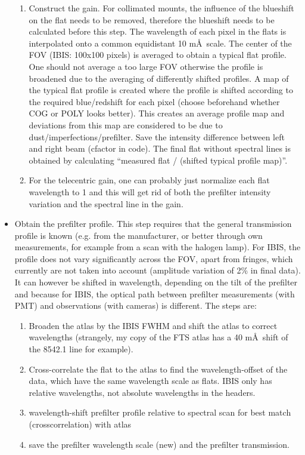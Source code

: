 \documentclass[a4paper,11pt]{article}
\begin{document}
\begin{itemize}
\begin{enumerate}
\item Construct the gain. For collimated mounts, the influence of the blueshift on the flat needs to be removed, therefore the blueshift needs to be calculated before this step. The wavelength of each pixel in the flats is interpolated onto a common equidistant 10 m\AA\ scale. The center of the FOV (IBIS: 100x100 pixels) is averaged to obtain a typical flat profile. One should not average a too large FOV otherwise the profile is broadened due to the averaging of differently shifted profiles. A map of the typical flat profile is created where the profile is shifted according to the required blue/redshift for each pixel (choose beforehand whether COG or POLY looks better). This creates an average profile map and deviations from this map are considered to be due to dust/imperfections/prefilter. Save the intensity difference between left and right beam (cfactor in code). The final flat without spectral lines is obtained by calculating ``measured flat / (shifted typical profile map)''.
\item For the telecentric gain, one can probably just normalize each flat wavelength to 1 and this will get rid of both the prefilter intensity variation and the spectral line in the gain.
\end{enumerate}

\item Obtain the prefilter profile. This step requires that the general transmission profile is known (e.g. from the manufacturer, or better through own measurements, for example from a scan with the halogen lamp). For IBIS, the profile does not vary significantly across the FOV, apart from fringes, which currently are not taken into account (amplitude variation of 2\% in final data). It can however be shifted in wavelength, depending on the tilt of the prefilter and because for IBIS, the optical path between prefilter measurements (with PMT) and observations (with cameras) is different. The steps are:
\begin{enumerate}
\item Broaden the atlas by the IBIS FWHM and shift the atlas to correct wavelengths (strangely, my copy of the FTS atlas has a 40 m\AA\ shift of the 8542.1 line for example).
\item Cross-correlate the flat to the atlas to find the wavelength-offset of the data, which have the same wavelength scale as flats. IBIS only has relative wavelengths, not absolute wavelengths in the headers.
\item wavelength-shift prefilter profile relative to spectral scan for best match (crosscorrelation) with atlas
\item save the prefilter wavelength scale (new) and the prefilter transmission.
\end{enumerate}


\end{itemize}
\end{document}
